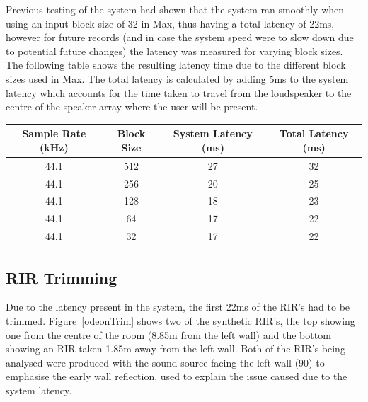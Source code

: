 \documentclass[../../main.tex]{subfiles}
\begin{document}
		Previous testing of the system had shown that the system ran smoothly when using an input block size of 32 in Max, thus having a total latency of 22ms, however for future records (and in case the system speed were to slow down due to potential future changes) the latency was measured for varying block sizes. The following table shows the resulting latency time due to the different block sizes used in Max. The total latency is calculated by adding 5ms to the system latency which accounts for the time taken to travel from the loudspeaker to the centre of the speaker array where the user will be present.

		\vspace{5mm}

		\begin{center}
		\begin{tabular}{|c |c |c |c|}
		\hline
		Sample Rate (kHz) & Block Size & System Latency (ms) & Total Latency (ms) \\ \hline
		44.1 & 512 & 27 & 32 \\ \hline
		44.1 & 256 & 20 & 25 \\ \hline
		44.1 & 128 & 18 & 23 \\ \hline
		44.1 & 64 & 17 & 22 \\ \hline
		44.1 & 32 & 17 & 22 \\ \hline
		\end{tabular}
		\end{center}


	\subsection{RIR Trimming}
	\label{RIRtrimming}
		Due to the latency present in the system, the first 22ms of the \ac{RIR}'s had to be trimmed. Figure~\ref{odeonTrim} shows two of the synthetic \ac{RIR}'s, the top showing one from the centre of the room (8.85m from the left wall) and the bottom showing an \ac{RIR} taken 1.85m away from the left wall. Both of the \ac{RIR}'s being analysed were produced with the sound source facing the left wall (90\textdegree) to emphasise the early wall reflection, used to explain the issue caused due to the system latency. 
\end{document}
